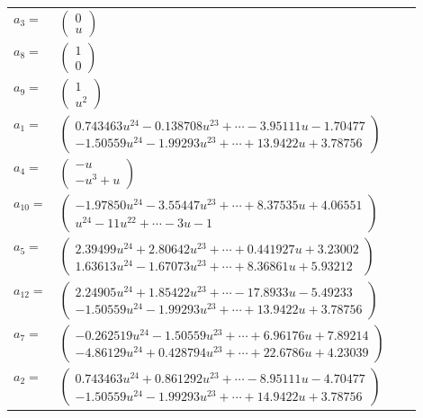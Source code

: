\documentclass[1p]{elsarticle_modified}
\theoremstyle{definition}
\begin{document}
\begin{tabular}{m{7pt} m{180pt} m{7pt} m{180pt} }
\flushright $a_{3}=$&$\begin{pmatrix}0\\u\end{pmatrix}$ \\
\flushright $a_{8}=$&$\begin{pmatrix}1\\0\end{pmatrix}$ \\
\flushright $a_{9}=$&$\begin{pmatrix}1\\u^2\end{pmatrix}$ \\
\flushright $a_{1}=$&$\begin{pmatrix}0.743463 u^{24}-0.138708 u^{23}+\cdots-3.95111 u-1.70477\\-1.50559 u^{24}-1.99293 u^{23}+\cdots+13.9422 u+3.78756\end{pmatrix}$ \\
\flushright $a_{4}=$&$\begin{pmatrix}- u\\- u^3+u\end{pmatrix}$ \\
\flushright $a_{10}=$&$\begin{pmatrix}-1.97850 u^{24}-3.55447 u^{23}+\cdots+8.37535 u+4.06551\\u^{24}-11 u^{22}+\cdots-3 u-1\end{pmatrix}$ \\
\flushright $a_{5}=$&$\begin{pmatrix}2.39499 u^{24}+2.80642 u^{23}+\cdots+0.441927 u+3.23002\\1.63613 u^{24}-1.67073 u^{23}+\cdots+8.36861 u+5.93212\end{pmatrix}$ \\
\flushright $a_{12}=$&$\begin{pmatrix}2.24905 u^{24}+1.85422 u^{23}+\cdots-17.8933 u-5.49233\\-1.50559 u^{24}-1.99293 u^{23}+\cdots+13.9422 u+3.78756\end{pmatrix}$ \\
\flushright $a_{7}=$&$\begin{pmatrix}-0.262519 u^{24}-1.50559 u^{23}+\cdots+6.96176 u+7.89214\\-4.86129 u^{24}+0.428794 u^{23}+\cdots+22.6786 u+4.23039\end{pmatrix}$ \\
\flushright $a_{2}=$&$\begin{pmatrix}0.743463 u^{24}+0.861292 u^{23}+\cdots-8.95111 u-4.70477\\-1.50559 u^{24}-1.99293 u^{23}+\cdots+14.9422 u+3.78756\end{pmatrix}$ \\

\end{tabular}
\end{document}
